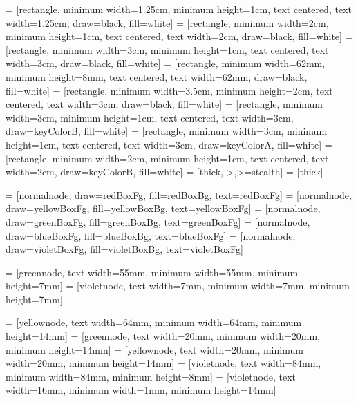 



 = [rectangle, minimum width=1.25cm, minimum height=1cm, text centered, text width=1.25cm, draw=black, fill=white]
 = [rectangle, minimum width=2cm, minimum height=1cm, text centered, text width=2cm, draw=black, fill=white]
 = [rectangle, minimum width=3cm, minimum height=1cm, text centered, text width=3cm, draw=black, fill=white]
 = [rectangle, minimum width=62mm, minimum height=8mm, text centered, text width=62mm, draw=black, fill=white]
 = [rectangle, minimum width=3.5cm, minimum height=2cm, text centered, text width=3cm, draw=black, fill=white]
 = [rectangle, minimum width=3cm, minimum height=1cm, text centered, text width=3cm, draw=keyColorB, fill=white]
 = [rectangle, minimum width=3cm, minimum height=1cm, text centered, text width=3cm, draw=keyColorA, fill=white]
 = [rectangle, minimum width=2cm, minimum height=1cm, text centered, text width=2cm, draw=keyColorB, fill=white]
 = [thick,->,>=stealth]
 = [thick]

 = [normalnode, draw=redBoxFg, fill=redBoxBg, text=redBoxFg]
 = [normalnode, draw=yellowBoxFg, fill=yellowBoxBg, text=yellowBoxFg]
 = [normalnode, draw=greenBoxFg, fill=greenBoxBg, text=greenBoxFg]
 = [normalnode, draw=blueBoxFg, fill=blueBoxBg, text=blueBoxFg]
 = [normalnode, draw=violetBoxFg, fill=violetBoxBg, text=violetBoxFg]

 = [greennode, text width=55mm, minimum width=55mm, minimum height=7mm]
 = [violetnode, text width=7mm, minimum width=7mm, minimum height=7mm]

 = [yellownode, text width=64mm, minimum width=64mm, minimum height=14mm]
 = [greennode, text width=20mm, minimum width=20mm, minimum height=14mm]
 = [yellownode, text width=20mm, minimum width=20mm, minimum height=14mm]
 = [violetnode, text width=84mm, minimum width=84mm, minimum height=8mm]
 = [violetnode, text width=16mm, minimum width=1mm, minimum height=14mm]
\newcommand{\consumerBox}[1]{{\color{greenBoxFg}\colorbox{greenBoxBg}{#1}}}
\newcommand{\producerBox}[1]{{\color{yellowBoxFg}\colorbox{yellowBoxBg}{#1}}}

